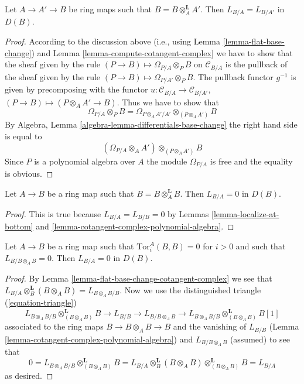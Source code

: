 \begin{lemma}
\label{lemma-localize-at-bottom}
Let $A \to A' \to B$ be ring maps such that $B = B \otimes_A^\mathbf{L} A'$.
Then $L_{B/A} = L_{B/A'}$ in $D(B)$.
\end{lemma}

\begin{proof}
According to the discussion above (i.e., using
Lemma \ref{lemma-flat-base-change})
and Lemma \ref{lemma-compute-cotangent-complex}
we have to show that the sheaf given
by the rule $(P \to B) \mapsto \Omega_{P/A} \otimes_P B$ on $\mathcal{C}_{B/A}$
is the pullback of the sheaf given by the rule
$(P \to B) \mapsto \Omega_{P/A'} \otimes_P B$.
The pullback functor $g^{-1}$ is given by precomposing with the
functor $u : \mathcal{C}_{B/A} \to \mathcal{C}_{B/A'}$,
$(P \to B) \mapsto (P \otimes_A A' \to B)$.
Thus we have to show that
$$
\Omega_{P/A} \otimes_P B =
\Omega_{P \otimes_A A'/A'} \otimes_{(P \otimes_A A')} B
$$
By Algebra, Lemma \ref{algebra-lemma-differentials-base-change}
the right hand side is equal to
$$
(\Omega_{P/A} \otimes_A A') \otimes_{(P \otimes_A A')} B
$$
Since $P$ is a polynomial algebra over $A$ the module
$\Omega_{P/A}$ is free and the equality is obvious.
\end{proof}

\begin{lemma}
\label{lemma-derived-diagonal}
Let $A \to B$ be a ring map such that $B = B \otimes_A^\mathbf{L} B$.
Then $L_{B/A} = 0$ in $D(B)$.
\end{lemma}

\begin{proof}
This is true because $L_{B/A} = L_{B/B} = 0$ by
Lemmas \ref{lemma-localize-at-bottom} and
\ref{lemma-cotangent-complex-polynomial-algebra}.
\end{proof}

\begin{lemma}
\label{lemma-bootstrap}
Let $A \to B$ be a ring map such that $\text{Tor}^A_i(B, B) = 0$ for $i > 0$
and such that $L_{B/B \otimes_A B} = 0$.
Then $L_{B/A} = 0$ in $D(B)$.
\end{lemma}

\begin{proof}
By Lemma \ref{lemma-flat-base-change-cotangent-complex} we see that
$L_{B/A} \otimes_B^\mathbf{L} (B \otimes_A B) = L_{B \otimes_A B/B}$.
Now we use the distinguished triangle (\ref{equation-triangle})
$$
L_{B \otimes_A B/B} \otimes^\mathbf{L}_{(B \otimes_A B)} B \to
L_{B/B} \to L_{B/B \otimes_A B} \to
L_{B \otimes_A B/B} \otimes^\mathbf{L}_{(B \otimes_A B)} B[1]
$$
associated to the ring maps $B \to B \otimes_A B \to B$ and the vanishing of
$L_{B/B}$ (Lemma \ref{lemma-cotangent-complex-polynomial-algebra}) and
$L_{B/B \otimes_A B}$ (assumed) to see that
$$
0 =
L_{B \otimes_A B/B} \otimes^\mathbf{L}_{(B \otimes_A B)} B =
L_{B/A} \otimes_B^\mathbf{L} (B \otimes_A B)
\otimes^\mathbf{L}_{(B \otimes_A B)} B = L_{B/A}
$$
as desired.
\end{proof}

